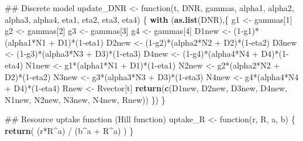\documentclass[11pt,]{article}
\newenvironment{Shaded}{\begin{snugshade}}{\end{snugshade}}
\newcommand{\KeywordTok}[1]{\textcolor[rgb]{0.13,0.29,0.53}{\textbf{{#1}}}}
\newcommand{\DecValTok}[1]{\textcolor[rgb]{0.00,0.00,0.81}{{#1}}}
\newcommand{\StringTok}[1]{\textcolor[rgb]{0.31,0.60,0.02}{{#1}}}
\newcommand{\NormalTok}[1]{{#1}}
\begin{document}
\begin{Shaded}
\begin{Highlighting}[]
  \NormalTok{## Discrete model}
  \NormalTok{update_DNR <-}\StringTok{ }\NormalTok{function(t, DNR, gammas,}
                         \NormalTok{alpha1, alpha2, alpha3, alpha4,}
                         \NormalTok{eta1, eta2, eta3, eta4) \{}
    \KeywordTok{with} \NormalTok{(}\KeywordTok{as.list}\NormalTok{(DNR),\{}
      \NormalTok{g1    <-}\StringTok{ }\NormalTok{gammas[}\DecValTok{1}\NormalTok{]}
      \NormalTok{g2    <-}\StringTok{ }\NormalTok{gammas[}\DecValTok{2}\NormalTok{]}
      \NormalTok{g3    <-}\StringTok{ }\NormalTok{gammas[}\DecValTok{3}\NormalTok{]}
      \NormalTok{g4    <-}\StringTok{ }\NormalTok{gammas[}\DecValTok{4}\NormalTok{]}
      \NormalTok{D1new <-}\StringTok{ }\NormalTok{(}\DecValTok{1}\NormalTok{-g1)*(alpha1*N1 +}\StringTok{ }\NormalTok{D1)*(}\DecValTok{1}\NormalTok{-eta1)}
      \NormalTok{D2new <-}\StringTok{ }\NormalTok{(}\DecValTok{1}\NormalTok{-g2)*(alpha2*N2 +}\StringTok{ }\NormalTok{D2)*(}\DecValTok{1}\NormalTok{-eta2)}
      \NormalTok{D3new <-}\StringTok{ }\NormalTok{(}\DecValTok{1}\NormalTok{-g3)*(alpha3*N3 +}\StringTok{ }\NormalTok{D3)*(}\DecValTok{1}\NormalTok{-eta3)}
      \NormalTok{D4new <-}\StringTok{ }\NormalTok{(}\DecValTok{1}\NormalTok{-g4)*(alpha4*N4 +}\StringTok{ }\NormalTok{D4)*(}\DecValTok{1}\NormalTok{-eta4)}
      \NormalTok{N1new <-}\StringTok{ }\NormalTok{g1*(alpha1*N1 +}\StringTok{ }\NormalTok{D1)*(}\DecValTok{1}\NormalTok{-eta1)}
      \NormalTok{N2new <-}\StringTok{ }\NormalTok{g2*(alpha2*N2 +}\StringTok{ }\NormalTok{D2)*(}\DecValTok{1}\NormalTok{-eta2)}
      \NormalTok{N3new <-}\StringTok{ }\NormalTok{g3*(alpha3*N3 +}\StringTok{ }\NormalTok{D3)*(}\DecValTok{1}\NormalTok{-eta3)}
      \NormalTok{N4new <-}\StringTok{ }\NormalTok{g4*(alpha4*N4 +}\StringTok{ }\NormalTok{D4)*(}\DecValTok{1}\NormalTok{-eta4)}
      \NormalTok{Rnew  <-}\StringTok{ }\NormalTok{Rvector[t]}
      \KeywordTok{return}\NormalTok{(}\KeywordTok{c}\NormalTok{(D1new, D2new, D3new, D4new, N1new, N2new, N3new, N4new, Rnew))}
    \NormalTok{\})}
  \NormalTok{\}}
  
  \NormalTok{##  Resource uptake function (Hill function)}
  \NormalTok{uptake_R <-}\StringTok{ }\NormalTok{function(r, R, a, b) \{}
    \KeywordTok{return}\NormalTok{( (r*R^a) /}\StringTok{ }\NormalTok{(b^a +}\StringTok{ }\NormalTok{R^a) )}
  \NormalTok{\}}
  

\end{Highlighting}
\end{Shaded}
\end{document}
